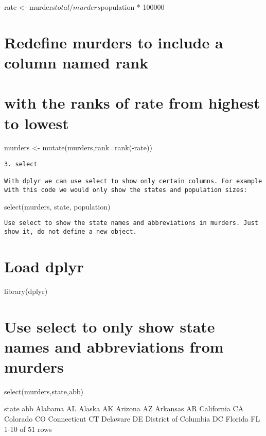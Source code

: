 \documentclass[
]{article}
\begin{document}
rate \textless- murders\(total/ murders\)population * 100000

\hypertarget{redefine-murders-to-include-a-column-named-rank}{%
\section{Redefine murders to include a column named
rank}\label{redefine-murders-to-include-a-column-named-rank}}

\hypertarget{with-the-ranks-of-rate-from-highest-to-lowest}{%
\section{with the ranks of rate from highest to
lowest}\label{with-the-ranks-of-rate-from-highest-to-lowest}}

murders \textless- mutate(murders,rank=rank(-rate))

\begin{verbatim}
3. select

With dplyr we can use select to show only certain columns. For example with this code we would only show the states and population sizes:
\end{verbatim}

select(murders, state, population)

\begin{verbatim}
Use select to show the state names and abbreviations in murders. Just show it, do not define a new object.
\end{verbatim}

\hypertarget{load-dplyr}{%
\section{Load dplyr}\label{load-dplyr}}

library(dplyr)

\hypertarget{use-select-to-only-show-state-names-and-abbreviations-from-murders}{%
\section{Use select to only show state names and abbreviations from
murders}\label{use-select-to-only-show-state-names-and-abbreviations-from-murders}}

select(murders,state,abb)

state abb Alabama AL Alaska AK Arizona AZ Arkansas AR California CA
Colorado CO Connecticut CT Delaware DE District of Columbia DC Florida
FL 1-10 of 51 rows
\end{document}
